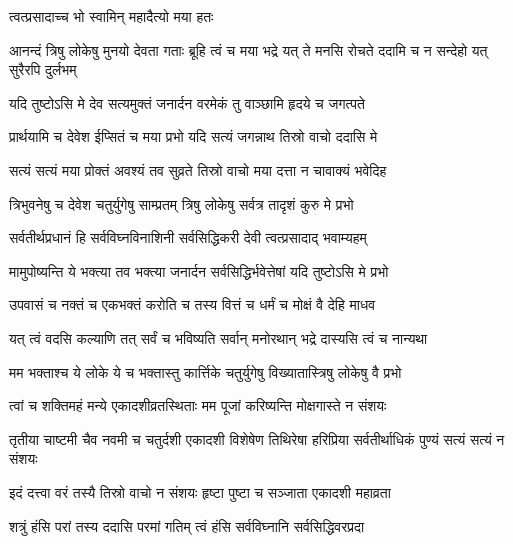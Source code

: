 \onelineshloka
{त्वत्प्रसादाच्च भो स्वामिन् महादैत्यो मया हतः}%


\threelineshloka
{आनन्दं त्रिषु लोकेषु मुनयो देवता गताः}
{ब्रूहि त्वं च मया भद्रे यत् ते मनसि रोचते}
{ददामि च न सन्देहो यत् सुरैरपि दुर्लभम्}%


\twolineshloka
{यदि तुष्टोऽसि मे देव सत्यमुक्तं जनार्दन}
{वरमेकं तु वाञ्छामि हृदये च जगत्पते}%

\twolineshloka
{प्रार्थयामि च देवेश ईप्सितं च मया प्रभो}
{यदि सत्यं जगन्नाथ तिस्रो वाचो ददासि मे}%


\twolineshloka
{सत्यं सत्यं मया प्रोक्तं अवश्यं तव सुव्रते}
{तिस्रो वाचो मया दत्ता न चावाक्यं भवेदिह}%


\twolineshloka
{त्रिभुवनेषु च देवेश चतुर्युगेषु साम्प्रतम्}
{त्रिषु लोकेषु सर्वत्र तादृशं कुरु मे प्रभो}%

\twolineshloka
{सर्वतीर्थप्रधानं हि सर्वविघ्नविनाशिनी}
{सर्वसिद्धिकरी देवी त्वत्प्रसादाद् भवाम्यहम्}%

\twolineshloka
{मामुपोष्यन्ति ये भक्त्या तव भक्त्या जनार्दन}
{सर्वसिद्धिर्भवेत्तेषां यदि तुष्टोऽसि मे प्रभो}%

\twolineshloka
{उपवासं च नक्तं च एकभक्तं करोति च}
{तस्य वित्तं च धर्मं च मोक्षं वै देहि माधव}%


\twolineshloka
{यत् त्वं वदसि कल्याणि तत् सर्वं च भविष्यति}
{सर्वान् मनोरथान् भद्रे दास्यसि त्वं च नान्यथा}%

\twolineshloka
{मम भक्ताश्च ये लोके ये च भक्तास्तु कार्त्तिके}
{चतुर्युगेषु विख्यातास्त्रिषु लोकेषु वै प्रभो}%

\twolineshloka
{त्वां च शक्तिमहं मन्ये एकादशीव्रतस्थिताः}
{मम पूजां करिष्यन्ति मोक्षगास्ते न संशयः}%

\threelineshloka
{तृतीया चाष्टमी चैव नवमी च चतुर्दशी}
{एकादशी विशेषेण तिथिरेषा हरिप्रिया}
{सर्वतीर्थाधिकं पुण्यं सत्यं सत्यं न संशयः}%

\twolineshloka
{इदं दत्त्वा वरं तस्यै तिस्रो वाचो न संशयः}
{हृष्टा पुष्टा च सञ्जाता एकादशी महाव्रता}%

\twolineshloka
{शत्रुं हंसि परां तस्य ददासि परमां गतिम्}
{त्वं हंसि सर्वविघ्नानि सर्वसिद्धिवरप्रदा}%

